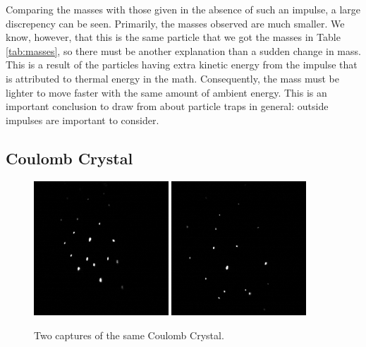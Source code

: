 \documentclass[12pt]{article}
\begin{document}
Comparing the masses with those given in the absence of such an impulse, a large discrepency can be seen. Primarily, the masses observed are much smaller. We know, however, that this is the same particle that we got the masses in Table \ref{tab:masses}, so there must be another explanation than a sudden change in mass. This is a result of the particles having extra kinetic energy from the impulse that is attributed to thermal energy in the math. Consequently, the mass must be lighter to move faster with the same amount of ambient energy. This is an important conclusion to draw from about particle traps in general: outside impulses are important to consider. 

\subsection{Coulomb Crystal}
\begin{figure}[!ht]
\centering
    \includegraphics[width=0.45\textwidth]{crystal_1.PNG}
    \includegraphics[width=0.45\textwidth]{crystal_2.PNG}
	\caption{Two captures of the same Coulomb Crystal.}
    \label{fig:crystals}
\end{figure}
\end{document}
